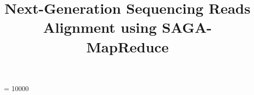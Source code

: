 \documentclass{sig-alternate}
\begin{document}
 {}
\widowpenalty = 10000



\newif\ifdraft
\drafttrue                                                                                                   

\ifdraft
 \newcommand{\jkimnote}[1]{{\textcolor{green}   { ***Joohyun:   #1 }}}
 \newcommand{\jhanote}[1]{  {\textcolor{red}     { ***SJ: #1 }}}
  \newcommand{\pmnote}[1]{  {\textcolor{red}     { ***Pradeep: #1 }}}
 \newcommand{\todo}[1]{  {\textcolor{red}     { ***TODO: #1 }}}
 \newcommand{\fix}[1]{  {\textcolor{red}     { ***FIX: #1 }}}
 \newcommand{\reviewer}[1]{}
\else
 \newcommand{\reviewer}[1]{}
 \newcommand{\jkimnote}[1]{}
 \newcommand{\pmnote}[1]{}
 \newcommand{\jhanote}[1]{}
 \newcommand{\todo}[1]{  {\textcolor{red}     { ***TODO: #1 }}}
 \newcommand{\fix}[1]{}                                                                                     
\fi

\title{Next-Generation Sequencing Reads Alignment using SAGA-MapReduce}
\end{document}
